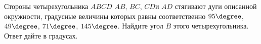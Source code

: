 \begin{ex}
	\begin{condition}
		Стороны четырехугольника \( ABCD  \) \( AB \), \( BC \), \( CD  \)и \( AD  \) стягивают дуги описанной окружности, градусные величины которых равны соответственно \( 95 \degree\), \( 49 \degree \), \( 71\degree \), \( 145 \degree\). Найдите угол \( B  \) этого четырехугольника. Ответ дайте в градусах.
	\end{condition}
\end{ex}
